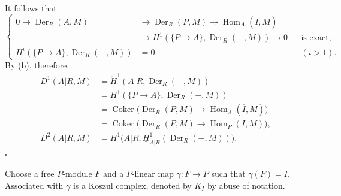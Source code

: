It follows that
\[
\left\{
\begin{aligned}
0\longrightarrow\operatorname{Der}_R(A,M)
&\longrightarrow\operatorname{Der}_R(P,M)
\longrightarrow\operatorname{Hom}_A(\overline I,M)\\
&\longrightarrow
H^1(\{P\longrightarrow A\},\operatorname{Der}_R(-,M))
\longrightarrow0
&&\text{is exact},\\
H^i(\{P\longrightarrow A\},\operatorname{Der}_R(-,M))
&=0 &&(i>1).
\end{aligned}
\right.
\]
By (b), therefore,
\begin{align*}
D^1(A|R,M)
 &=\check H^1(A|R,\operatorname{Der}_R(-,M))\\
 &=H^1(\{P\longrightarrow A\},\operatorname{Der}_R(-,M))\\
 &=\operatorname{Coker}\bigl(
   \operatorname{Der}_R(P,M)\longrightarrow
   \operatorname{Hom}_A(\overline I,M)\bigr)\\
 &=\operatorname{Coker}\bigl(
   \operatorname{Der}_R(P,M)\longrightarrow
   \operatorname{Hom}_P(I,M)\bigr),\\
D^2(A|R,M)
 &=H^1\bigl(A|R,
   \underline H^1_{A|R}(\operatorname{Der}_R(-,M))\bigr).
\end{align*}
\hfill$\square$

Choose a free $P$-module $F$ and a $P$-linear map
$\gamma:F\longrightarrow P$ such that $\gamma(F)=I$. Associated
with $\gamma$ is a Koszul complex, denoted by $K_I$ by abuse of
notation.
